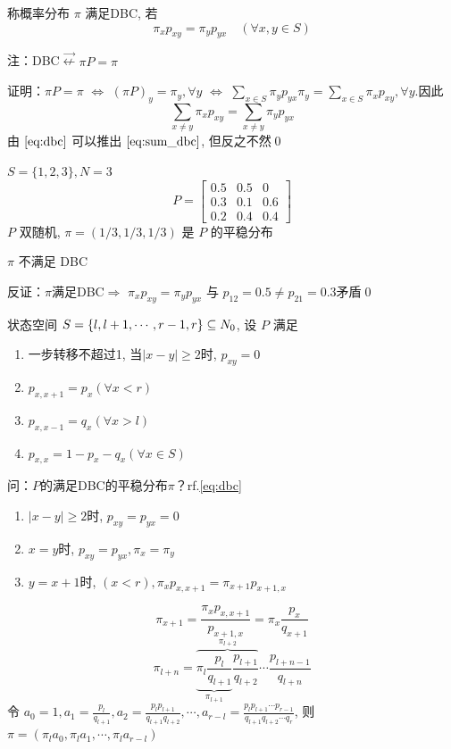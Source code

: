 \begin{definition}
    称概率分布 $\pi$ 满足DBC, 若
    \begin{equation}
        \pi_xp_{xy}=\pi_y p_{yx}\quad (\forall x,y\in S)
    \label{eq:dbc}
    \end{equation}
\end{definition}

注：DBC$\stackrel{\rightarrow}{\nleftarrow} \pi P=\pi$

证明：$\pi P=\pi$ $\Leftrightarrow$ $ (\pi P)_y=\pi_y,\forall y$ $\Leftrightarrow$ $\sum_{x\in S}\pi_y p_{yx}\pi_y=\sum_{x\in S}\pi_x p_{xy},\forall y$.因此
\begin{equation}
    \sum_{x\neq y}\pi_x p_{xy}=\sum_{x\neq y}\pi_y p_{yx}
    \label{eq:sum_dbc}
\end{equation}
由 $\eqref{eq:dbc}$ 可以推出 $\eqref{eq:sum_dbc}$, 但反之不然\qed

\begin{example}[DBC反例]
    $S=\{1,2,3\},N=3$
    \[
    P=\begin{bmatrix}
        0.5 & 0.5 & 0\\
        0.3 & 0.1 & 0.6\\
        0.2 & 0.4 & 0.4
    \end{bmatrix}
    \]
    $P$ 双随机, $\pi=(1/3,1/3,1/3)$ 是 $P$ 的平稳分布
    \begin{claim}
        $\pi$ 不满足 DBC
    \end{claim}
    反证：$\pi$满足DBC$\Rightarrow$ $\pi_x p_{xy}=\pi_y p_{yx}$ 与 $p_{12}=0.5\neq p_{21}=0.3$矛盾\qed
\end{example}

\begin{example}[生灭链]
    状态空间 $S=\{l,l+1,\cdots,r-1,r\}\subseteq N_0$, 设 $P$ 满足
    \begin{enumerate}
        \item 一步转移不超过1, 当$|x-y|\geq 2$时, $p_{xy}=0$
        \item $p_{x,x+1}=p_x(\forall x<r)$
        \item $p_{x,x-1}=q_x(\forall x>l)$
        \item $p_{x,x}=1-p_x-q_x(\forall x\in S)$
    \end{enumerate}
    问：$P$的满足DBC的平稳分布$\pi$？rf.\eqref{eq:dbc}
\end{example}

\begin{enumerate}
    \item $|x-y|\geq 2$时, $p_{xy}=p_{yx}=0$
    \item $x=y$时, $p_{xy}=p_{yx},\pi_x=\pi_y$
    \item $y=x+1$时, $(x<r),\pi_x p_{x,x+1}=\pi_{x+1}p_{x+1,x}$
\end{enumerate}
\[
\pi_{x+1}=\frac{\pi_x p_{x,x+1}}{p_{x+1,x}}=\pi_x\frac{p_x}{q_{x+1}}
\]
\[
\pi_{l+n}=\overbrace{\underbrace{\pi_l\frac{p_l}{q_{l+1}}}_{\pi_{l+1}} \frac{p_{l+1}}{q_{l+2}}}^{\pi_{l+2}}\cdots \frac{p_{l+n-1}}{q_{l+n}}
\]
令 $a_0=1,a_1=\frac{p_l}{q_{l+1}},a_2=\frac{p_l p_{l+1}}{q_{l+1} q_{l+2}},\cdots,a_{r-l}=\frac{p_lp_{l+1}\cdots p_{r-1}}{q_{l+1}q_{l+2}\cdots q_r}$, 则 $\pi=(\pi_l a_0,\pi_l a_1,\cdots, \pi_l a_{r-l})$

